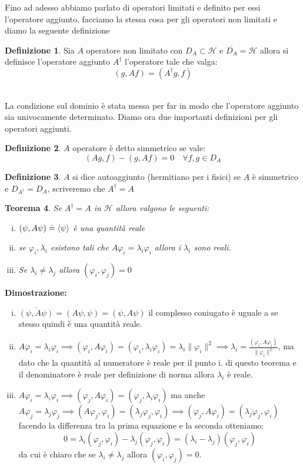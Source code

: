 \documentclass[12pt]{book}
\theoremstyle{plain}
\renewcommand{\H}{\mathcal{H}}
\newtheorem{thm}{Teorema}[section]
\theoremstyle{definition}
\newtheorem{dfn}[thm]{Definizione}
\theoremstyle{remark}
\begin{document}
Fino ad adesso abbiamo parlato di operatori limitati e definito per essi l'operatore aggiunto, facciamo la stessa cosa per gli operatori non limitati e diamo la seguente definizione
\begin{dfn}
\label{aggiunto_nonlimitato}
Sia $A$ operatore non limitato con $D_A\subset\H$ e $\overline{D_A}=\H$ allora si definisce l'operatore aggiunto $A^\dagger$ l'operatore tale che valga:
\[(g,Af) = (A^\dagger g,f)\]
\end{dfn}\leavevmode
\\La condizione sul dominio è stata messa per far in modo che l'operatore aggiunto sia univocamente determinato. Diamo ora due importanti definizioni per gli operatori aggiunti.
\begin{dfn}
$A$ operatore è detto simmetrico se vale:
\[(Ag,f) - (g,Af) = 0\quad \forall f,g\in D_A\]
\end{dfn}
\begin{dfn}
$A$ si dice autoaggiunto (hermitiano per i fisici) se $A$ è simmetrico e $D_{A^\dagger} = D_A$, scriveremo che $A^\dagger = A$
\end{dfn}
\begin{thm}
Se $A^\dagger = A $ in $\H$ allora valgono le seguenti:
\begin{enumerate}[i.]
\item $(\psi,A\psi) \doteq \braket{\psi}$ è una quantità reale
\item se $\varphi_i,\lambda_i$ esistono tali che $A\varphi_i = \lambda_i\varphi_i$ allora i $\lambda_i$ sono reali.
\item Se $\lambda_i\neq \lambda_j$ allora $(\varphi_i,\varphi_j)=0$
\end{enumerate}
\end{thm}
\hspace{-1.6em}\textbf{Dimostrazione:}
\begin{enumerate}[i.]
\item $\overline{(\psi,A\psi)} = (A\psi,\psi) = (\psi,A\psi)$ il complesso coniugato è uguale a se stesso quindi è una quantità reale.
\item $A\varphi_i = \lambda_i\varphi_i \implies (\varphi_i,A\varphi_i) =(\varphi_i, \lambda_i\varphi_i) = \lambda_i\|\varphi_i\|^2 \implies \lambda_i = \frac{(\varphi_i,A\varphi_i)}{\|\varphi_i\|^2} $, ma dato che la quantità al numeratore è reale per il punto i. di questo teorema e il denominatore è reale per definizione di norma allora $\lambda_i$ è reale.
\item $A\varphi_i = \lambda_i\varphi_i \implies (\varphi_j,A\varphi_i) = (\varphi_j,\lambda_i\varphi_i)$ ma anche $A\varphi_j = \lambda_j\varphi_j \implies (A\varphi_j,\varphi_i) = (\lambda_j\varphi_j,\varphi_i) \implies (\varphi_j,A\varphi_i) = (\lambda_j\varphi_j,\varphi_i) $
facendo la differenza tra la prima equazione e la seconda otteniamo:
\[0 = \lambda_i(\varphi_j,\varphi_i)- \lambda_j(\varphi_j,\varphi_i) = (\lambda_i-\lambda_j)(\varphi_j,\varphi_i) \]
da cui è chiaro che se $\lambda_i\neq \lambda_j$ allora $(\varphi_i,\varphi_j)=0$.
\end{enumerate}\leavevmode
\end{document}
